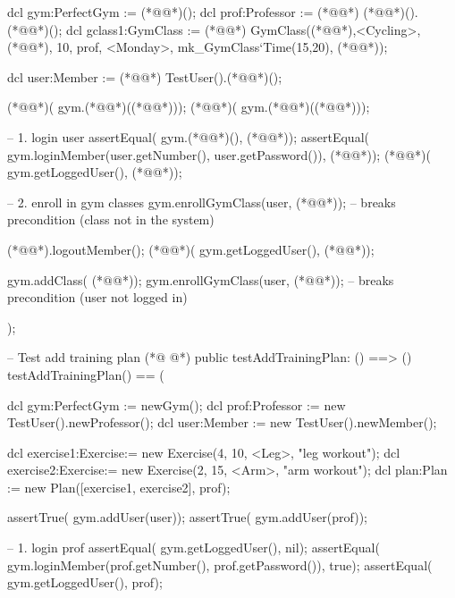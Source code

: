 \begin{vdmpp}[breaklines=true]
  dcl gym:PerfectGym := (*@@*)();
  dcl prof:Professor := (*@@*) (*@@*)().(*@@*)();
  dcl gclass1:GymClass := (*@@*) GymClass((*@@*),<Cycling>, (*@@*), 10, prof, <Monday>, mk_GymClass`Time(15,20), (*@@*));
 
  dcl user:Member := (*@@*) TestUser().(*@@*)(); 
  
  (*@@*)( gym.(*@@*)((*@@*)));
  (*@@*)( gym.(*@@*)((*@@*)));
  
  -- 1. login user
  assertEqual( gym.(*@@*)(), (*@@*)); 
  assertEqual( gym.loginMember(user.getNumber(), user.getPassword()), (*@@*));
  (*@@*)( gym.getLoggedUser(), (*@@*));
  
  -- 2. enroll in gym classes
  gym.enrollGymClass(user, (*@@*));    -- breaks precondition (class not in the system)
    
   (*@@*).logoutMember();
   (*@@*)( gym.getLoggedUser(), (*@@*)); 
   
   gym.addClass( (*@@*)); 
   gym.enrollGymClass(user, (*@@*));    -- breaks precondition (user not logged in)
      
 );
 
 -- Test add training plan
(*@
\label{testAddTrainingPlan:373}
@*)
 public testAddTrainingPlan: () ==> ()
 testAddTrainingPlan() == (
  
  dcl gym:PerfectGym := newGym();
  dcl prof:Professor := new TestUser().newProfessor();  
  dcl user:Member := new TestUser().newMember(); 
 
  dcl exercise1:Exercise:= new Exercise(4, 10, <Leg>, "leg workout");
  dcl exercise2:Exercise:= new Exercise(2, 15, <Arm>, "arm workout");
  dcl plan:Plan := new Plan([exercise1, exercise2], prof);
  
  assertTrue( gym.addUser(user));
  assertTrue( gym.addUser(prof));
  
  -- 1. login prof
  assertEqual( gym.getLoggedUser(), nil); 
  assertEqual( gym.loginMember(prof.getNumber(), prof.getPassword()), true);
  assertEqual( gym.getLoggedUser(), prof);
  

\end{vdmpp}
